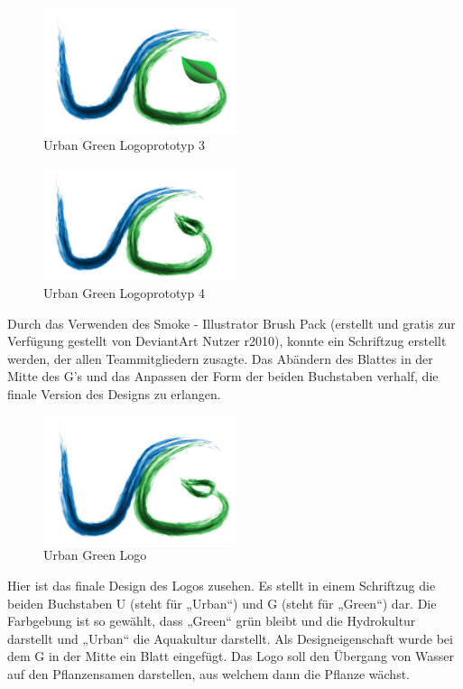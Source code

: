 \begin{figure}[ht]
    \centering
    \includegraphics[width=0.5\textwidth]{images/ug_Logoproto_3}
	\caption{Urban Green Logoprototyp 3}
\end{figure}
\begin{figure}[ht]
    \centering
	\includegraphics[width=0.5\textwidth]{images/ug_Logoproto_4}
	\caption{Urban Green Logoprototyp 4}
\end{figure}

Durch das Verwenden des Smoke - Illustrator Brush Pack \cite{SmokeBrushSet} (erstellt und gratis zur Verfügung gestellt von DeviantArt Nutzer r2010), konnte ein Schriftzug erstellt werden, der allen Teammitgliedern zusagte. Das Abändern des Blattes in der Mitte des G's und das Anpassen der Form der beiden Buchstaben verhalf, die finale Version des Designs zu erlangen.
\newpage

\begin{figure}[ht]
    \centering
    \includegraphics[width=0.5\textwidth]{images/logo}
	\caption{Urban Green Logo}
\end{figure}

Hier ist das finale Design des Logos zusehen. Es stellt in einem Schriftzug die beiden Buchstaben U (steht für „Urban“) und G (steht für „Green“) dar. Die Farbgebung ist so gewählt, dass „Green“ grün bleibt und die Hydrokultur darstellt und „Urban“ die Aquakultur darstellt. Als Designeigenschaft wurde bei dem G in der Mitte ein Blatt eingefügt. Das Logo soll den Übergang von Wasser auf den Pflanzensamen darstellen, aus welchem dann die Pflanze wächst.

